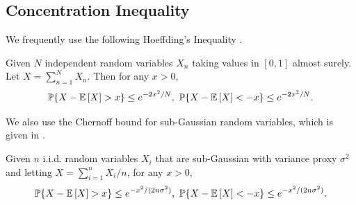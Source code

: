 \subsection{Concentration Inequality}
We frequently use the following Hoeffding's Inequality \cite{boucheron2013concentration}.
\begin{fact}\label{fact:hoeffding}
Given $N$ independent random variables $X_n$ taking values in $[0,1]$ almost surely. Let $X = \sum_{n=1}^N X_n$. Then for any $x > 0$,
    \[\mathbb{P}\{X-\mathbb E\left[X\right] > x\} \leq e^{-2x^2/N},~\mathbb{P}\{X-\mathbb E\left[X\right] < -x\} \leq e^{-2x^2/N}.\]
\end{fact}
We also use the Chernoff bound for sub-Gaussian random variables, which is given in \cite[Page 25]{boucheron2013concentration}.
\begin{fact}\label{fact:chernoff}
Given $n$ i.i.d. random variables $X_i$ that are sub-Gaussian with variance proxy $\sigma^2$ and letting $X = \sum_{i=1}^n X_i / n$, for any $x > 0$,
\[
\mathbb{P}\{X-\mathbb E\left[X\right] > x\} \leq e^{-x^2/(2n\sigma^2)},~\mathbb{P}\{X-\mathbb E\left[X\right] < -x\} \leq e^{-x^2 / (2n\sigma^2)}.
\]
\end{fact}
